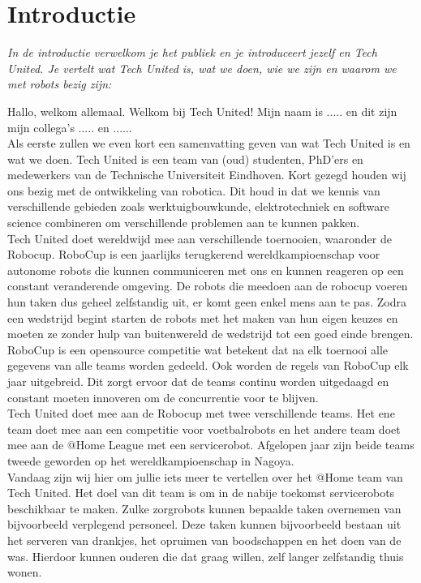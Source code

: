 \documentclass[a4paper,10pt]{article}
\numberwithin{equation}{section}
\numberwithin{figure}{section}
\numberwithin{table}{section}
\begin{document}
\section*{Introductie}
\textit{In de introductie verwelkom je het publiek en je introduceert jezelf en Tech United. Je vertelt wat Tech United is, wat we doen, wie we zijn en waarom we met robots bezig zijn:}\

Hallo, welkom allemaal. Welkom bij Tech United! Mijn naam is ..... en dit zijn mijn collega’s ..... en ...... \\

Als eerste zullen we even kort een samenvatting geven van wat Tech United is en wat we doen. Tech United is een team van (oud) studenten, PhD'ers en medewerkers van de Technische Universiteit Eindhoven. Kort gezegd houden wij ons bezig met de ontwikkeling van robotica. Dit houd in dat we kennis van verschillende gebieden zoals werktuigbouwkunde, elektrotechniek en software science combineren om verschillende problemen aan te kunnen pakken.\\

Tech United doet wereldwijd mee aan verschillende toernooien, waaronder de Robocup. RoboCup is een jaarlijks terugkerend wereldkampioenschap voor autonome robots die kunnen communiceren met ons en kunnen reageren op een constant veranderende omgeving. De robots die meedoen aan de robocup voeren hun taken dus geheel zelfstandig uit, er komt geen enkel mens aan te pas. Zodra een wedstrijd begint starten de robots met het maken van hun eigen keuzes en moeten ze zonder hulp van buitenwereld de wedstrijd tot een goed einde brengen. RoboCup is een opensource competitie wat betekent dat na elk toernooi alle gegevens van alle teams worden gedeeld. Ook worden de regels van RoboCup elk jaar uitgebreid. Dit zorgt ervoor dat de teams continu worden uitgedaagd en constant moeten innoveren om de concurrentie voor te blijven.\\

Tech United doet mee aan de Robocup met twee verschillende teams. Het ene team doet mee aan een competitie voor voetbalrobots en het andere team doet mee aan de @Home League met een servicerobot. Afgelopen jaar zijn beide teams tweede geworden op het wereldkampioenschap in Nagoya.\\

Vandaag zijn wij hier om jullie iets meer te vertellen over het @Home team van Tech United. Het doel van dit team is om in de nabije toekomst servicerobots beschikbaar te maken. Zulke zorgrobots kunnen bepaalde taken overnemen van bijvoorbeeld verplegend personeel. Deze taken kunnen bijvoorbeeld bestaan uit het serveren van drankjes, het opruimen van boodschappen en het doen van de was. Hierdoor kunnen ouderen die dat graag willen, zelf langer zelfstandig thuis wonen. 
\end{document}
